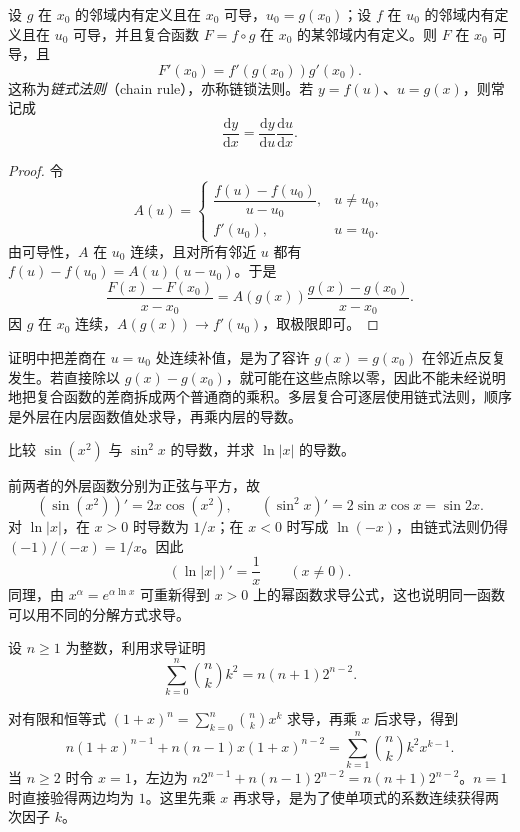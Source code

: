 \documentclass[UTF8,12pt,a4paper,fontset=fandol]{ctexbook}
\begin{document}
\begin{theorem}[链式法则]
\label{thm:one-variable-chain-rule}
设 $g$ 在 $x_0$ 的邻域内有定义且在 $x_0$ 可导，$u_0=g(x_0)$；设 $f$ 在 $u_0$ 的邻域内有定义且在 $u_0$ 可导，并且复合函数 $F=f\circ g$ 在 $x_0$ 的某邻域内有定义。则 $F$ 在 $x_0$ 可导，且
\begin{equation}
\label{eq:one-variable-chain-rule}
    F'(x_0)=f'(g(x_0))g'(x_0).
\end{equation}
这称为\emph{链式法则}（chain rule），亦称链锁法则。若 $y=f(u)$、$u=g(x)$，则常记成
\[
    \frac{\mathrm dy}{\mathrm dx}
    =\frac{\mathrm dy}{\mathrm du}\frac{\mathrm du}{\mathrm dx}.
\]
\end{theorem}
\begin{proof}
令
\[
    A(u)=\begin{cases}
        \dfrac{f(u)-f(u_0)}{u-u_0},&u\ne u_0,\\[4pt]
        f'(u_0),&u=u_0.
    \end{cases}
\]
由可导性，$A$ 在 $u_0$ 连续，且对所有邻近 $u$ 都有 $f(u)-f(u_0)=A(u)(u-u_0)$。于是
\[
    \frac{F(x)-F(x_0)}{x-x_0}
    =A(g(x))\frac{g(x)-g(x_0)}{x-x_0}.
\]
因 $g$ 在 $x_0$ 连续，$A(g(x))\to f'(u_0)$，取极限即可。
\end{proof}

证明中把差商在 $u=u_0$ 处连续补值，是为了容许 $g(x)=g(x_0)$ 在邻近点反复发生。若直接除以 $g(x)-g(x_0)$，就可能在这些点除以零，因此不能未经说明地把复合函数的差商拆成两个普通商的乘积。多层复合可逐层使用链式法则，顺序是外层在内层函数值处求导，再乘内层的导数。

\begin{example}
\label{ex:chain-rule-and-logarithm-derivatives}
比较 $\sin(x^2)$ 与 $\sin^2x$ 的导数，并求 $\ln|x|$ 的导数。
\end{example}
\begin{solve}
前两者的外层函数分别为正弦与平方，故
\[
    (\sin(x^2))'=2x\cos(x^2),\qquad
    (\sin^2x)'=2\sin x\cos x=\sin2x.
\]
对 $\ln|x|$，在 $x>0$ 时导数为 $1/x$；在 $x<0$ 时写成 $\ln(-x)$，由链式法则仍得 $(-1)/(-x)=1/x$。因此
\[
    (\ln|x|)'=\frac1x\qquad(x\ne0).
\]
同理，由 $x^\alpha=e^{\alpha\ln x}$ 可重新得到 $x>0$ 上的幂函数求导公式，这也说明同一函数可以用不同的分解方式求导。
\end{solve}

\begin{example}
\label{ex:binomial-square-sum-by-differentiation}
设 $n\geq1$ 为整数，利用求导证明
\[
    \sum_{k=0}^n\binom nk k^2=n(n+1)2^{n-2}.
\]
\end{example}
\begin{solve}
对有限和恒等式 $(1+x)^n=\sum_{k=0}^n\binom nk x^k$ 求导，再乘 $x$ 后求导，得到
\[
    n(1+x)^{n-1}+n(n-1)x(1+x)^{n-2}
    =\sum_{k=1}^n\binom nk k^2x^{k-1}.
\]
当 $n\geq2$ 时令 $x=1$，左边为 $n2^{n-1}+n(n-1)2^{n-2}=n(n+1)2^{n-2}$。$n=1$ 时直接验得两边均为 $1$。这里先乘 $x$ 再求导，是为了使单项式的系数连续获得两次因子 $k$。
\end{solve}
\end{document}
